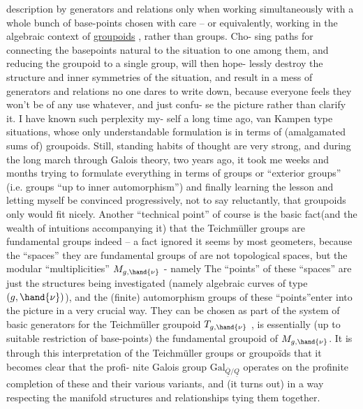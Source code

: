 description by generators and relations only when working simultaneously
with a whole bunch of base-points chosen with care -- or equivalently,
working in the algebraic context of \uline{groupoids} , rather than groups. Cho-%
sing paths for connecting the basepoints natural to the situation to  one
among them, and reducing the groupoid to a single group, will then hope-%
lessly destroy the structure and inner symmetries of the situation, and
result in a mess of generators and relations no one dares to write down,
because everyone feels they won't be of any use whatever, and just confu-%
se the picture rather than clarify it. I have known such perplexity my-%
self a long time ago,   van Kampen type situations, whose
only understandable formulation is in terms of (amalgamated sums of)
groupoids. Still, standing habits of thought are very strong, and
during the long march through Galois theory, two years ago, it took me
weeks and months trying to formulate everything in terms of groups or
``exterior groups'' (i.e. groups ``up to inner automorphism'')\hand{,} and finally
 learning the lesson
and letting myself be convinced progressively, not to say reluctantly,
that  groupoids only would fit nicely. Another ``technical point'' of
course is the basic fact(and the wealth of intuitions accompanying it)
that the Teichmüller groups are  fundamental groups indeed -- a
fact ignored it seems by most geometers, because the  ``spaces'' they are
fundamental groups of are not topological spaces, but 
the modular ``multiplicities'' $M_{g,\hand{\nu}}$ - namely \hand{\uline{\textcolor{black}{topoi}}}\hand{!} The ``points'' of these
``spaces'' are just the structures being investigated (namely algebraic
curves of type $(g,\hand{\nu})$), and the (finite) automorphism groups of these
``points''enter into the picture in a very crucial way. They can be  chosen
as part of the system of basic generators for the Teichmüller groupoid
$T_{g,\hand{\nu}}$ ,   is essentially (up to suitable restriction of base-points)
 the fundamental groupoid of $M_{g,\hand{\nu}}$. It is through this interpretation of
the Teichmüller groups or groupoïds that it becomes clear that the profi-%
nite Galois group $\mathrm{Gal}_{\overline{\underline{Q}}/\underline{Q}}$ operates on the profinite completion of these
and  their various variants, and  (it turns out) in a way respecting the
manifold structures and relationships tying them  together.

